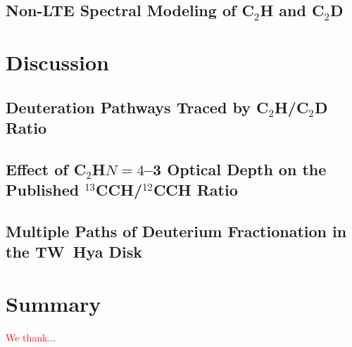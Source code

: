 \documentclass[linenumbers, twocolumn, times]{aastex631}
\newcommand{\CCH}{C$_2$H\xspace}
\newcommand{\CCD}{C$_2$D\xspace}
\begin{document}
\subsection{Non-LTE Spectral Modeling of \CCH and \CCD}

\section{Discussion} \label{sec:discussion}

\subsection{Deuteration Pathways Traced by \CCH/\CCD Ratio}

\subsection{Effect of \CCH $N=4$--3 Optical Depth on the Published $^{13}$CCH/$^{12}$CCH Ratio}

\subsection{Multiple Paths of Deuterium Fractionation in the TW~Hya Disk}

\section{Summary} \label{sec:summary}


\begin{acknowledgments}
\textcolor{red}{We thank...}
\end{acknowledgments}

%

\vspace{5mm}
\facilities{\textcolor{red}{facilities used here}}

\end{document}
